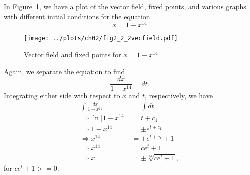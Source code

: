 
In Figure~\ref{fig2_2_2vecfield}, we have a plot of the vector field, fixed points,
and various graphs with different initial conditions for the equation 
\[
    \dot{x} = 1 - x^{14}
\]
\begin{figure}[!ht]
    \texttt{[image: ../plots/ch02/fig2\_2\_2vecfield.pdf]}
    \caption{Vector field and fixed points for $\dot{x} = 1 - x^{14}$\label{fig2_2_2vecfield}}
\end{figure}

Again, we separate the equation to find
\[
    \frac{dx}{1 - x^{14}} = dt.
\]
Integrating either side with respect to $x$ and $t$, respectively, we have
\begin{equation*}
    \begin{split}
        \int \frac{dx}{1 - x^{14}} &= \int dt \\
        \Rightarrow \ln{\lvert 1 - x^{14} \rvert} &= t + c_1 \\
        \Rightarrow 1 - x^{14} &= \pm e^{t + c_1} \\
        \Rightarrow x^{14} &= \pm e^{t + c_1} + 1 \\
        \Rightarrow x^{14} &= ce^t + 1 \\
        \Rightarrow x &= \pm \sqrt[14]{ce^t + 1},
    \end{split}
\end{equation*}
for $ce^t + 1 >= 0$.
